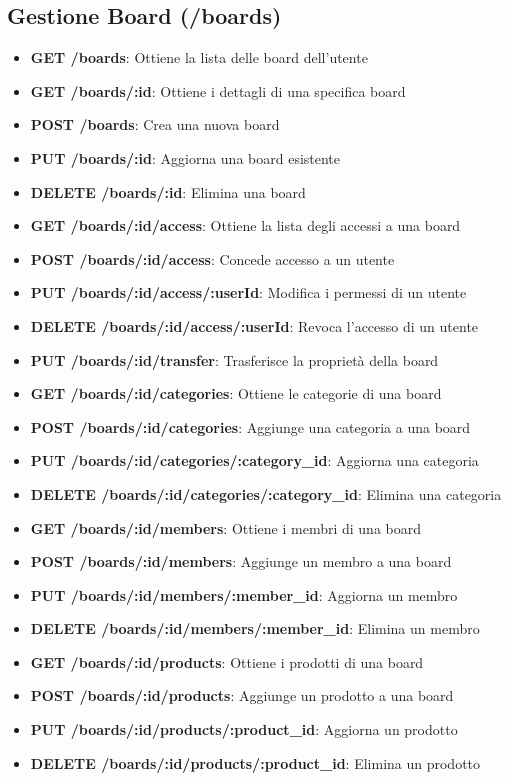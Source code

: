 \documentclass[11pt]{article}
\begin{document}
\subsection{Gestione Board (/boards)}
\begin{itemize}
    \item \textbf{GET /boards}: Ottiene la lista delle board dell'utente
    \item \textbf{GET /boards/:id}: Ottiene i dettagli di una specifica board
    \item \textbf{POST /boards}: Crea una nuova board
    \item \textbf{PUT /boards/:id}: Aggiorna una board esistente
    \item \textbf{DELETE /boards/:id}: Elimina una board

    \item \textbf{GET /boards/:id/access}: Ottiene la lista degli accessi a una board
    \item \textbf{POST /boards/:id/access}: Concede accesso a un utente
    \item \textbf{PUT /boards/:id/access/:userId}: Modifica i permessi di un utente
    \item \textbf{DELETE /boards/:id/access/:userId}: Revoca l'accesso di un utente
    \item \textbf{PUT /boards/:id/transfer}: Trasferisce la proprietà della board

    \item \textbf{GET /boards/:id/categories}: Ottiene le categorie di una board
    \item \textbf{POST /boards/:id/categories}: Aggiunge una categoria a una board
    \item \textbf{PUT /boards/:id/categories/:category\_id}: Aggiorna una categoria
    \item \textbf{DELETE /boards/:id/categories/:category\_id}: Elimina una categoria

    \item \textbf{GET /boards/:id/members}: Ottiene i membri di una board
    \item \textbf{POST /boards/:id/members}: Aggiunge un membro a una board
    \item \textbf{PUT /boards/:id/members/:member\_id}: Aggiorna un membro
    \item \textbf{DELETE /boards/:id/members/:member\_id}: Elimina un membro

    \item \textbf{GET /boards/:id/products}: Ottiene i prodotti di una board
    \item \textbf{POST /boards/:id/products}: Aggiunge un prodotto a una board
    \item \textbf{PUT /boards/:id/products/:product\_id}: Aggiorna un prodotto
    \item \textbf{DELETE /boards/:id/products/:product\_id}: Elimina un prodotto
\end{itemize}
\end{document}
